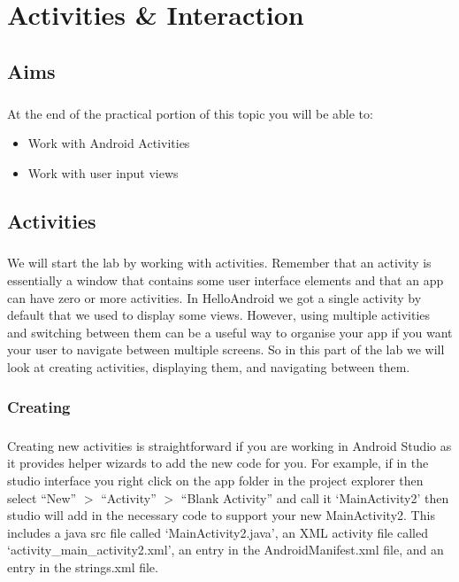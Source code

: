 \chapter{Activities \& Interaction}

\section{Aims}
\paragraph{} At the end of the practical portion of this topic you will be able to:

\begin{itemize}
\item Work with Android Activities
\item Work with user input views
\end{itemize}

\section{Activities}
\paragraph{} We will start the lab by working with activities. Remember that an activity is essentially a window that contains some user interface elements and that an app can have zero or more activities. In HelloAndroid we got a single activity by default that we used to display some views. However, using multiple activities and switching between them can be a useful way to organise your app if you want your user to navigate between multiple screens. So in this part of the lab we will look at creating activities, displaying them, and navigating between them.


\subsection{Creating}
\paragraph{} Creating new activities is straightforward if you are working in Android Studio as it provides helper wizards to add the new code for you. For example, if in the studio interface you right click on the app folder in the project explorer then select ``New'' $>$ ``Activity'' $>$ ``Blank Activity'' and call it `MainActivity2' then studio will add in the necessary code to support your new MainActivity2. This includes a java src file called `MainActivity2.java', an XML activity file called `activity\_main\_activity2.xml', an entry in the AndroidManifest.xml file, and an entry in the strings.xml file.

